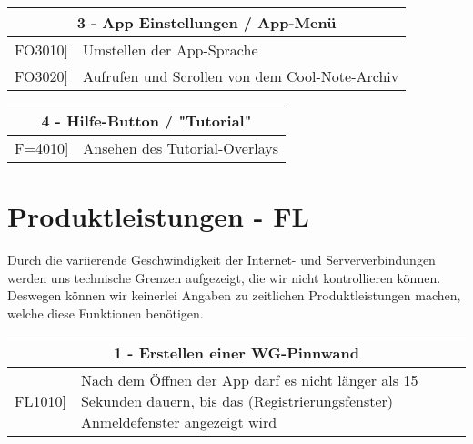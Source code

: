 \documentclass[a4paper]{scrreprt}
\begin{document}
    		\begin{table}[h!]
    			\centering
    			\label{my-label}
    			\begin{tabular}{p{2cm}p{12cm}}
    				
    				\multicolumn{2}{c}{\textbf{3 - App Einstellungen / App-Menü}} \\ \hline
    				\centering{[}FO3010{]} & Umstellen der App-Sprache\\
    				\centering{[}FO3020{]} & Aufrufen und Scrollen von dem Cool-Note-Archiv\\
    				\hline
    			\end{tabular}
    		\end{table}
    		
    		\vspace{5mm}
    		
    		\begin{table}[h!]
    			\centering
    			\label{my-label}
    			\begin{tabular}{p{2cm}p{12cm}}
    				
    				\multicolumn{2}{c}{\textbf{4 - Hilfe-Button / "Tutorial"}} \\ \hline
    				\centering{[}F=4010{]} & Ansehen des Tutorial-Overlays\\    				
    				\hline
    			\end{tabular}
    		\end{table}
    		
    		\vspace{1cm}
    		
    		\newpage
    		
    		\section{Produktleistungen - FL}
    		Durch die variierende Geschwindigkeit der Internet- und Serververbindungen werden uns technische Grenzen aufgezeigt, die wir nicht kontrollieren können. Deswegen können wir keinerlei Angaben zu zeitlichen Produktleistungen machen, welche diese Funktionen benötigen. 
    		\\
    		
    		\begin{table}[h!]
    			\centering
    			\label{my-label}
    			\begin{tabular}{p{2cm}p{12cm}}
    				
    				\multicolumn{2}{c}{\textbf{1 - Erstellen einer WG-Pinnwand}} \\ \hline
    				\centering{[}FL1010{]} & Nach dem Öffnen der App darf es nicht länger als 15 Sekunden dauern, bis das (Registrierungsfenster) Anmeldefenster angezeigt wird \\
    				\hline
    			\end{tabular}
    		\end{table}
    		
\end{document}
